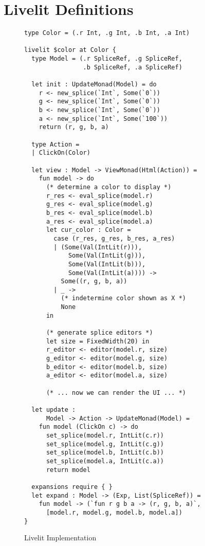 \section{Livelit Definitions}\label{sec:livelit-definitions}

\begin{figure}
\begin{lstlisting}[xleftmargin=0.2cm,morekeywords={expansions,require}]
type Color = (.r Int, .g Int, .b Int, .a Int)

livelit $color at Color {
  type Model = (.r SpliceRef, .g SpliceRef, 
                .b SpliceRef, .a SpliceRef)

  let init : UpdateMonad(Model) = do 
    r <- new_splice(`Int`, Some(`0`))
    g <- new_splice(`Int`, Some(`0`))
    b <- new_splice(`Int`, Some(`0`))
    a <- new_splice(`Int`, Some(`100`))
    return (r, g, b, a)

  type Action = 
  | ClickOn(Color)

  let view : Model -> ViewMonad(Html(Action)) = 
    fun model -> do 
      (* determine a color to display *)
      r_res <- eval_splice(model.r)
      g_res <- eval_splice(model.g)
      b_res <- eval_splice(model.b)
      a_res <- eval_splice(model.a)
      let cur_color : Color = 
        case (r_res, g_res, b_res, a_res) 
        | (Some(Val(IntLit(r))), 
            Some(Val(IntLit(g))), 
            Some(Val(IntLit(b))), 
            Some(Val(IntLit(a)))) -> 
          Some((r, g, b, a))
        | _ -> 
          (* indetermine color shown as X *)
          None 
      in 
      
      (* generate splice editors *)
      let size = FixedWidth(20) in 
      r_editor <- editor(model.r, size)
      g_editor <- editor(model.g, size)
      b_editor <- editor(model.b, size)
      a_editor <- editor(model.a, size)
      
      (* ... now we can render the UI ... *)
    
  let update : 
      Model -> Action -> UpdateMonad(Model) =
    fun model (ClickOn c) -> do 
      set_splice(model.r, IntLit(c.r))
      set_splice(model.g, IntLit(c.g))
      set_splice(model.b, IntLit(c.b))
      set_splice(model.a, IntLit(c.a))
      return model
  
  expansions require { }
  let expand : Model -> (Exp, List(SpliceRef)) = 
    fun model -> (`fun r g b a -> (r, g, b, a)`, 
      [model.r, model.g, model.b, model.a])
}
\end{lstlisting}
\vspace{-8px}
\caption{Livelit Implementation}
\label{fig:color-impl}
\end{figure}

